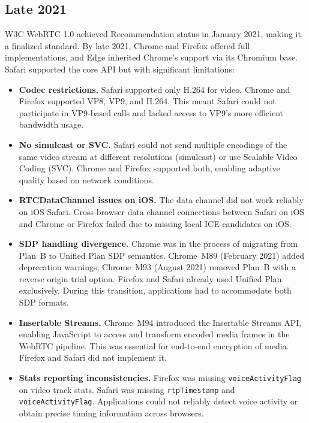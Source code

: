 \documentclass[11pt]{article}
\begin{document}
\subsection{Late 2021}

W3C WebRTC 1.0 achieved Recommendation status in January 2021, making it a
finalized standard. By late 2021, Chrome and Firefox offered full
implementations, and Edge inherited Chrome's support via its Chromium base.
Safari supported the core API but with significant limitations:

\begin{itemize}
  \item \textbf{Codec restrictions.} Safari supported only H.264 for video.
    Chrome and Firefox supported VP8, VP9, and H.264. This meant Safari could
    not participate in VP9-based calls and lacked access to VP9's more
    efficient bandwidth usage.
  \item \textbf{No simulcast or SVC.} Safari could not send multiple
    encodings of the same video stream at different resolutions (simulcast)
    or use Scalable Video Coding (SVC). Chrome and Firefox supported both,
    enabling adaptive quality based on network conditions.
  \item \textbf{RTCDataChannel issues on iOS.} The data channel did not work
    reliably on iOS Safari. Cross-browser data channel connections between
    Safari on iOS and Chrome or Firefox failed due to missing local ICE
    candidates on iOS.
  \item \textbf{SDP handling divergence.} Chrome was in the process of
    migrating from Plan~B to Unified Plan SDP semantics. Chrome~M89
    (February 2021) added deprecation warnings; Chrome~M93 (August 2021)
    removed Plan~B with a reverse origin trial option. Firefox and Safari
    already used Unified Plan exclusively. During this transition, applications
    had to accommodate both SDP formats.
  \item \textbf{Insertable Streams.} Chrome~M94 introduced the
    Insertable Streams API, enabling JavaScript to access and transform
    encoded media frames in the WebRTC pipeline. This was essential for
    end-to-end encryption of media. Firefox and Safari did not implement it.
  \item \textbf{Stats reporting inconsistencies.} Firefox was missing
    \texttt{voice\-Activity\-Flag} on video track stats. Safari was missing
    \texttt{rtpTimestamp} and \texttt{voiceActivityFlag}. Applications could
    not reliably detect voice activity or obtain precise timing information
    across browsers.
\end{itemize}
\end{document}
